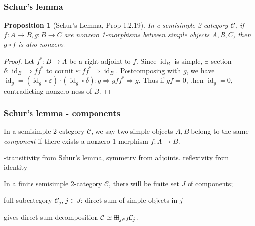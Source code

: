 \documentclass{beamer}
\newcommand{\veps}{{\varepsilon}}
\DeclareMathOperator{\id}{id}
\newtheorem{proposition}[theorem]{Proposition}
\newcommand{\cC}{{\mathcal{C}}}
\newcommand{\bigboxplus}{\Huge \boxplus}
\begin{document}
\begin{frame}
\frametitle{Schur's lemma}

\begin{proposition}
[Schur's Lemma, \cite{DRfusion}{Prop 1.2.19}]
\label{p:schur-lemma}
In a semisimple 2-category $\cC$,
if $f: A \to B, g: B \to C$ are nonzero 1-morphisms
between simple objects $A,B,C$,
then $g \circ f$ is also nonzero.
\end{proposition}

\pause

\begin{proof}


\pause
Let $f^*: B \to A$ be a right adjoint to $f$.
\pause
Since $\id_B$ is simple, $\exists$ section
$\delta: \id_B \Rightarrow ff^*$
to counit $\veps: ff^* \Rightarrow \id_B$.
\pause
Postcomposing with $g$,
we have $\id_g = (\id_g \circ \veps) \cdot (\id_g \circ \delta):
g \Rightarrow gff^* \Rightarrow g$.
\pause
Thus if $gf = 0$, then $\id_g = 0$,
contradicting nonzero-ness of $B$.
\end{proof}

\end{frame}

\begin{frame}
\frametitle{Schur's lemma - components}


\begin{definition}
In a semisimple 2-category $\cC$,
we say two simple objects $A,B$ belong to the same
\emph{component} if there exists a nonzero 1-morphism
$f: A \to B$.
\end{definition}

\pause

-transitivity from Schur's lemma, symmetry from adjoints,
reflexivity from identity

\pause

In a finite semisimple 2-category $\cC$,
there will be finite set $J$ of components;

\pause

full subcategory $\cC_j$, $j \in J$:
direct sum of simple objects in $j$

\pause

gives direct sum decomposition
$\cC \simeq \bigboxplus_{j \in J} \cC_j$.

\end{frame}
\end{document}
